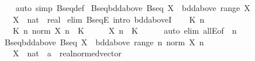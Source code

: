 \begin{isabellebody}
\isadelimproof
\ \ %
\endisadelimproof
%
\isatagproof
{}\isamarkupfalse%
\ {\isacharparenleft}{\kern0pt}auto\ simp{\isacharcolon}{\kern0pt}\ Bseq{\isacharunderscore}{\kern0pt}def{\isacharparenright}{\kern0pt}%
\endisatagproof
{\isafoldproof}%
%
\isadelimproof
\isanewline
%
\endisadelimproof
\isanewline
{}\isamarkupfalse%
\ Bseq{\isacharunderscore}{\kern0pt}bdd{\isacharunderscore}{\kern0pt}above{\isacharcolon}{\kern0pt}\ {\isachardoublequoteopen}Bseq\ X\ {\isasymLongrightarrow}\ bdd{\isacharunderscore}{\kern0pt}above\ {\isacharparenleft}{\kern0pt}range\ X{\isacharparenright}{\kern0pt}{\isachardoublequoteclose}\isanewline
\ \ \ X\ {\isacharcolon}{\kern0pt}{\isacharcolon}{\kern0pt}\ {\isachardoublequoteopen}nat\ {\isasymRightarrow}\ real{\isachardoublequoteclose}\isanewline
%
\isadelimproof
%
\endisadelimproof
%
\isatagproof
{}\isamarkupfalse%
\ {\isacharparenleft}{\kern0pt}elim\ BseqE{\isacharcomma}{\kern0pt}\ intro\ bdd{\isacharunderscore}{\kern0pt}aboveI{}{\isacharparenright}{\kern0pt}\isanewline
\ \ \isamarkupfalse%
\ K\ n\isanewline
\ \ \isamarkupfalse%
\ {\isachardoublequoteopen}{}\ {\isacharless}{\kern0pt}\ K{\isachardoublequoteclose}\ {\isachardoublequoteopen}{\isasymforall}n{\isachardot}{\kern0pt}\ norm\ {\isacharparenleft}{\kern0pt}X\ n{\isacharparenright}{\kern0pt}\ {\isasymle}\ K{\isachardoublequoteclose}\isanewline
\ \ \isamarkupfalse%
\ \isamarkupfalse%
\ {\isachardoublequoteopen}X\ n\ {\isasymle}\ K{\isachardoublequoteclose}\isanewline
\ \ \ \ \isamarkupfalse%
\ {\isacharparenleft}{\kern0pt}auto\ elim{\isacharbang}{\kern0pt}{\isacharcolon}{\kern0pt}\ allE{\isacharbrackleft}{\kern0pt}of\ {\isacharunderscore}{\kern0pt}\ n{\isacharbrackright}{\kern0pt}{\isacharparenright}{\kern0pt}\isanewline
{}\isamarkupfalse%
%
\endisatagproof
{\isafoldproof}%
%
\isadelimproof
\isanewline
%
\endisadelimproof
\isanewline
{}\isamarkupfalse%
\ Bseq{\isacharunderscore}{\kern0pt}bdd{\isacharunderscore}{\kern0pt}above{\isacharprime}{\kern0pt}{\isacharcolon}{\kern0pt}\ {\isachardoublequoteopen}Bseq\ X\ {\isasymLongrightarrow}\ bdd{\isacharunderscore}{\kern0pt}above\ {\isacharparenleft}{\kern0pt}range\ {\isacharparenleft}{\kern0pt}{\isasymlambda}n{\isachardot}{\kern0pt}\ norm\ {\isacharparenleft}{\kern0pt}X\ n{\isacharparenright}{\kern0pt}{\isacharparenright}{\kern0pt}{\isacharparenright}{\kern0pt}{\isachardoublequoteclose}\isanewline
\ \ \ X\ {\isacharcolon}{\kern0pt}{\isacharcolon}{\kern0pt}\ {\isachardoublequoteopen}nat\ {\isasymRightarrow}\ {\isacharprime}{\kern0pt}a\ {\isacharcolon}{\kern0pt}{\isacharcolon}{\kern0pt}\ real{\isacharunderscore}{\kern0pt}normed{\isacharunderscore}{\kern0pt}vector{\isachardoublequoteclose}\isanewline

\end{isabellebody}
